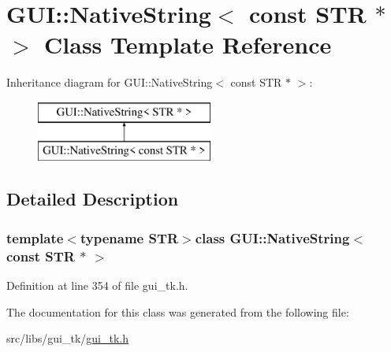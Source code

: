 \hypertarget{classGUI_1_1NativeString_3_01const_01STR_01_5_01_4}{\section{G\-U\-I\-:\-:Native\-String$<$ const S\-T\-R $\ast$ $>$ Class Template Reference}
\label{classGUI_1_1NativeString_3_01const_01STR_01_5_01_4}
}
Inheritance diagram for G\-U\-I\-:\-:Native\-String$<$ const S\-T\-R $\ast$ $>$\-:\begin{figure}[H]
\begin{center}
\leavevmode
\includegraphics[height=2.000000cm]{classGUI_1_1NativeString_3_01const_01STR_01_5_01_4}
\end{center}
\end{figure}


\subsection{Detailed Description}
\subsubsection*{template$<$typename S\-T\-R$>$class G\-U\-I\-::\-Native\-String$<$ const S\-T\-R $\ast$ $>$}



Definition at line 354 of file gui\-\_\-tk.\-h.



The documentation for this class was generated from the following file\-:\begin{DoxyCompactItemize}
\item 
src/libs/gui\-\_\-tk/\hyperlink{gui__tk_8h}{gui\-\_\-tk.\-h}\end{DoxyCompactItemize}
